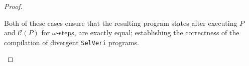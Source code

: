 \documentclass{article}
\begin{document}
\begin{proof}
\begin{itemize}
        Both of these cases ensure that the resulting program states after executing $P$ and $\mathcal{C}(P)$ for $\omega$-steps, are exactly equal; establishing the correctness of the compilation of divergent \texttt{SelVeri} programs.
        
    \end{itemize}
\end{proof}
\end{document}
